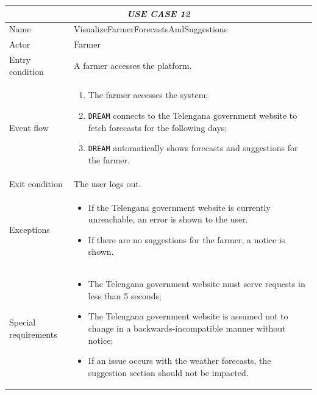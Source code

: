 \documentclass{article}
\begin{document}
\centering
\begin{tabular}{|p{3.5cm}|m{8cm}|}
 \hline
 \multicolumn{2}{|c|}{\emph{USE CASE 12}} \\
 \hline
 Name & VisualizeFarmerForecastsAndSuggestions\\
 \hline
 Actor & Farmer\\
 \hline
 Entry condition & A farmer accesses the platform.\\
 \hline
 Event flow & \begin{enumerate}
    \item The farmer accesses the system;
    \item \verb|DREAM| connects to the Telengana government website to fetch forecasts for the following days;
    \item \verb|DREAM| automatically shows forecasts and suggestions for the farmer.
 \end{enumerate}\\
 \hline
 Exit condition & The user logs out.\\
 \hline
 Exceptions & \begin{itemize}
     \item If the Telengana government website is currently unreachable, an error is shown to the user.
     \item If there are no suggestions for the farmer, a notice is shown.
 \end{itemize}\\
 \hline
 Special requirements &\begin{itemize}
     \item The Telengana government website must serve requests in less than 5 seconds;
     \item The Telengana government website is assumed not to change in a backwards-incompatible manner without notice;
     \item If an issue occurs with the weather forecasts, the suggestion section should not be impacted.
 \end{itemize}\\
 \hline
\end{tabular}
\end{document}
